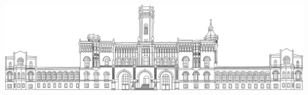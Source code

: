\begin{titlepage}
	\begin{addmargin}[-1cm]{-1.5cm}
	\vspace{1cm}
    \begin{center}
    	\includegraphics[width=13.8cm]{gfx/welfenschloss}
        \large  


        \begingroup
            \huge{}\LARGE{}
            \huge{}\LARGE{}
            \huge{}\LARGE{} \\
        \endgroup
		\smallskip
        \normalsize
         \\

        \vfill
        
        \LARGE {\color{LUHblue}\spacedallcaps \myTitle} \\
        \vfill
        \normalsize {} \\
        \vfill
        
        \normalsize {} \\ %
        \smallskip
        \large \myName \\
        \smallskip
        \normalsize \myMatriculationNumber \\
        \smallskip
        \normalsize {} \\ %
        

\end{center}
\end{addmargin}
\end{titlepage}
